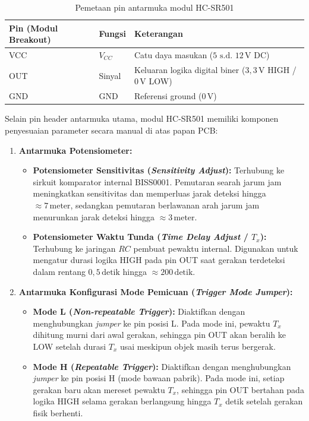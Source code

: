 \begin{table}[H]
    \centering
    \caption{Pemetaan pin antarmuka modul HC-SR501}
    \label{tab:hc_sr501_pin}
    \small
    \begin{tabularx}{\textwidth}{@{} p{3.2cm} p{2.2cm} X @{}}
        \toprule
        Pin (Modul Breakout) & Fungsi & Keterangan \\
        \midrule
        VCC  & $V_{CC}$ & Catu daya masukan ($5\text{ s.d. }12\,\text{V DC}$) \\
        OUT  & Sinyal & Keluaran logika digital biner ($3{,}3\,\text{V}$ HIGH / $0\,\text{V}$ LOW) \\
        GND  & GND & Referensi ground ($0\,\text{V}$) \\
        \bottomrule
    \end{tabularx}
\end{table}

Selain pin header antarmuka utama, modul HC-SR501 memiliki komponen penyesuaian parameter secara manual di atas papan PCB:

\begin{enumerate}
    \item \textbf{Antarmuka Potensiometer:}
    \begin{itemize}
        \item \textbf{Potensiometer Sensitivitas (\textit{Sensitivity Adjust}):} Terhubung ke sirkuit komparator internal BISS0001. Pemutaran searah jarum jam meningkatkan sensitivitas dan memperluas jarak deteksi hingga $\approx 7\,\text{meter}$, sedangkan pemutaran berlawanan arah jarum jam menurunkan jarak deteksi hingga $\approx 3\,\text{meter}$.
        \item \textbf{Potensiometer Waktu Tunda (\textit{Time Delay Adjust} / $T_x$):} Terhubung ke jaringan $RC$ pembuat pewaktu internal. Digunakan untuk mengatur durasi logika HIGH pada pin OUT saat gerakan terdeteksi dalam rentang $0{,}5\,\text{detik}$ hingga $\approx 200\,\text{detik}$.
    \end{itemize}

    \item \textbf{Antarmuka Konfigurasi Mode Pemicuan (\textit{Trigger Mode Jumper}):}
    \begin{itemize}
        \item \textbf{Mode L (\textit{Non-repeatable Trigger}):} Diaktifkan dengan menghubungkan \textit{jumper} ke pin posisi L. Pada mode ini, pewaktu $T_x$ dihitung murni dari awal gerakan, sehingga pin OUT akan beralih ke LOW setelah durasi $T_x$ usai meskipun objek masih terus bergerak.
        \item \textbf{Mode H (\textit{Repeatable Trigger}):} Diaktifkan dengan menghubungkan \textit{jumper} ke pin posisi H (mode bawaan pabrik). Pada mode ini, setiap gerakan baru akan mereset pewaktu $T_x$, sehingga pin OUT bertahan pada logika HIGH selama gerakan berlangsung hingga $T_x$ detik setelah gerakan fisik berhenti.
    \end{itemize}
\end{enumerate}

